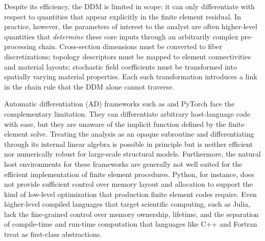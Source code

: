 Despite its efficiency, the DDM is limited in scope: it can only
differentiate with respect to quantities that appear explicitly in the
finite element residual.  In practice, however, the
parameters of interest to the analyst are often higher-level quantities
that \emph{determine} these core inputs through an arbitrarily complex pre-processing chain.  
Cross-section dimensions must be converted to
fiber discretizations; topology descriptors must be mapped to element
connectivities and material layouts; stochastic field coefficients
must be transformed into spatially varying material properties.  Each
such transformation introduces a link in the chain rule that the DDM alone cannot traverse.

Automatic differentiation (AD) frameworks such as \Jax{} and PyTorch
face the complementary limitation.  
They can differentiate arbitrary
host-language code with ease, but they are unaware of the implicit
function defined by the finite element solve.  Treating the analysis
as an opaque subroutine and differentiating through its internal
linear algebra is possible in principle but is neither efficient nor
numerically robust for large-scale structural models.
Furthermore, the natural host environments for these frameworks are
generally not well suited for the efficient implementation of finite
element procedures.  Python, for instance, does not provide sufficient
control over memory layout and allocation to support the kind of
low-level optimization that production finite element codes require.
Even higher-level compiled languages that target scientific computing,
such as Julia, lack the fine-grained control over memory ownership,
lifetime, and the separation of compile-time and run-time computation
that languages like C++ and Fortran treat as first-class abstractions.


